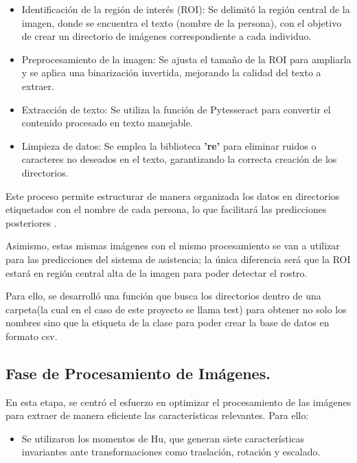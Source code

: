 \documentclass[12pt, letterpaper]{article}
\begin{document}
\begin{itemize}
    \item Identificación de la región de interés (ROI): Se delimitó la región central de la imagen, donde se encuentra el texto (nombre de la persona), con el objetivo de crear un directorio de imágenes correspondiente a cada individuo.
    \item Preprocesamiento de la imagen: Se ajusta el tamaño de la ROI para ampliarla y se aplica una binarización invertida, mejorando la calidad del texto a extraer.
    \item Extracción de texto: Se utiliza la función de Pytesseract para convertir el contenido procesado en texto manejable.
    \item Limpieza de datos: Se emplea la biblioteca \textbf{'re'} para eliminar ruidos o caracteres no deseados en el texto, garantizando la correcta creación de los directorios.
\end{itemize}

Este proceso permite estructurar de manera organizada los datos en directorios etiquetados con el nombre de cada persona, lo que facilitará las predicciones posteriores \cite{13}.\par 

Asimismo, estas mismas imágenes con el mismo procesamiento se van a utilizar para las predicciones del sistema de asistencia; la única diferencia será que la ROI estará en región central alta de la imagen para poder detectar el rostro.\par
Para ello, se desarrolló una función que busca los directorios dentro de una carpeta(la cual en el caso de este proyecto se llama test) para obtener no solo los nombres sino que la etiqueta de la clase para poder crear la base de datos en formato csv.

\subsection{Fase de Procesamiento de Imágenes.}

En esta etapa, se centró el esfuerzo en optimizar el procesamiento de las imágenes para extraer de manera eficiente las características relevantes. Para ello:
\begin{itemize}
    \item Se utilizaron los momentos de Hu, que generan siete características invariantes ante transformaciones como traslación, rotación y escalado.
\end{itemize}
\end{document}
